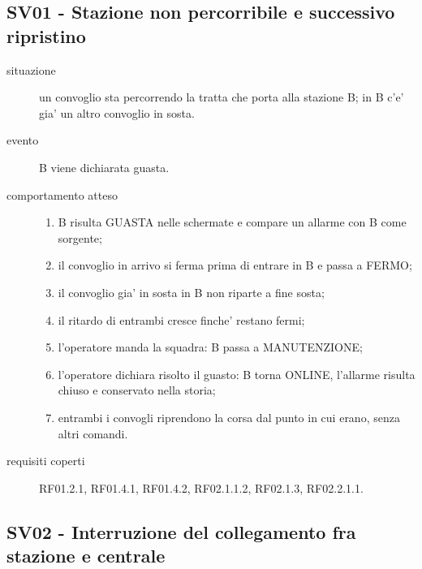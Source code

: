 \documentclass[11pt]{article}
\begin{document}
\subsection{SV01 - Stazione non percorribile e successivo ripristino}
\label{sec:orgf9b7a6e}

\begin{description}
\item[{situazione}] un convoglio sta percorrendo la tratta che porta alla stazione B; in B c'e' gia' un
altro convoglio in sosta.
\item[{evento}] B viene dichiarata guasta.
\item[{comportamento atteso}] \begin{enumerate}
\item B risulta GUASTA nelle schermate e compare un allarme con B come sorgente;
\item il convoglio in arrivo si ferma prima di entrare in B e passa a FERMO;
\item il convoglio gia' in sosta in B non riparte a fine sosta;
\item il ritardo di entrambi cresce finche' restano fermi;
\item l'operatore manda la squadra: B passa a MANUTENZIONE;
\item l'operatore dichiara risolto il guasto: B torna ONLINE, l'allarme risulta chiuso e conservato
nella storia;
\item entrambi i convogli riprendono la corsa dal punto in cui erano, senza altri comandi.
\end{enumerate}
\item[{requisiti coperti}] RF01.2.1, RF01.4.1, RF01.4.2, RF02.1.1.2, RF02.1.3, RF02.2.1.1.
\end{description}
\subsection{SV02 - Interruzione del collegamento fra stazione e centrale}
\label{sec:org1ac8ed1}
\end{document}
